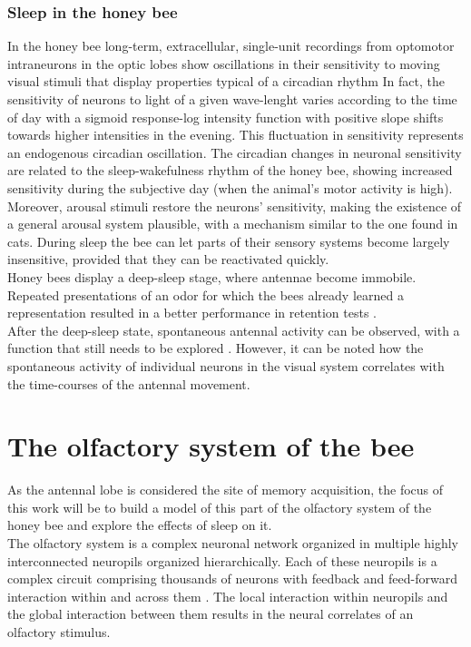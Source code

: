     \subsubsection{Sleep in the honey bee}
    In the honey bee long-term, extracellular, single-unit recordings from optomotor intraneurons in the optic lobes show oscillations in their sensitivity to moving visual stimuli that display properties typical of a circadian rhythm \cite{neuronal-correlates-sleep-bee}
    In fact, the sensitivity of neurons to light of a given wave-lenght varies according to the time of day with a sigmoid response-log intensity function with positive slope shifts towards higher intensities in the evening.
    This fluctuation in sensitivity represents an endogenous circadian oscillation.
    The circadian changes in neuronal sensitivity are related to the sleep-wakefulness rhythm of the honey bee, showing increased sensitivity during the subjective day (when the animal's motor activity is high).\\
    Moreover, arousal stimuli restore the neurons' sensitivity, making the existence of a general arousal system plausible, with a mechanism similar to the one found in cats.
    During sleep the bee can let parts of their sensory systems become largely insensitive, provided that they can be reactivated quickly.\\
    Honey bees display a deep-sleep stage, where antennae become immobile.
    Repeated presentations of an odor for which the bees already learned a representation resulted in a better performance in retention tests \cite{bee-odor-retention}.\\
    After the deep-sleep state, spontaneous antennal activity can be observed, with a function that still needs to be explored \cite{bee-sleep-description}.
    However, it can be noted how the spontaneous activity of individual neurons in the visual system correlates with the time-courses of the antennal movement.

\section{The olfactory system of the bee}
As the antennal lobe is considered the site of memory acquisition, the focus of this work will be to build a model of this part of the olfactory system of the honey bee and explore the effects of sleep on it.\\
The olfactory system is a complex neuronal network organized in multiple highly interconnected neuropils organized hierarchically.
Each of these neuropils is a complex circuit comprising thousands of neurons with feedback and feed-forward interaction within and across them \cite{olfactory-coding-honeybee}.
The local interaction within neuropils and the global interaction between them results in the neural correlates of an olfactory stimulus.

